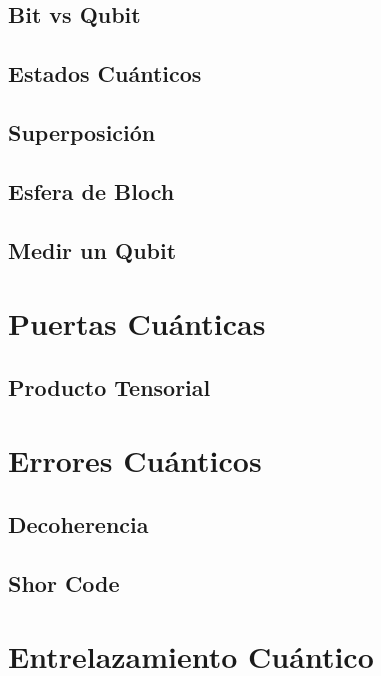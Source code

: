 \documentclass{article}
\numberwithin{equation}{section} %
\begin{document}
    \subsection{Bit vs Qubit}
    \subsection{Estados Cuánticos}
    \subsection{Superposición}
    \subsection{Esfera de Bloch}    
    \subsection{Medir un Qubit}






    \newpage
    \thispagestyle{empty}
    \mbox{}

    \section{Puertas Cuánticas}
    \subsection{Producto Tensorial}




    \newpage
    \thispagestyle{empty}
    \mbox{}

    \section{Errores Cuánticos}
    \subsection{Decoherencia}
    \subsection{Shor Code}





    \newpage
    \thispagestyle{empty}
    \mbox{}

    \section{Entrelazamiento Cuántico}
\end{document}
